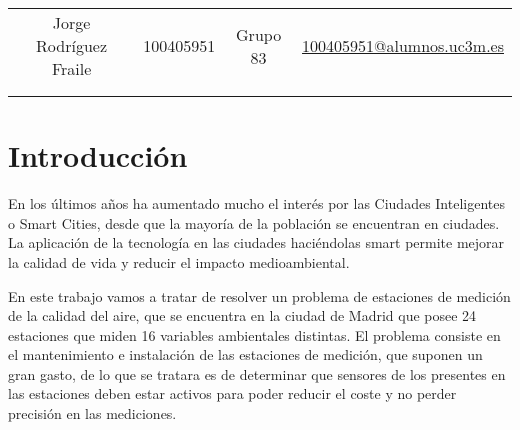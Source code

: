 \documentclass[12pt, spanish, pdftex]{UC3M_document}
\author{Jorge Rodríguez Fraile}
\begin{document}
\begin{titlepage}

  \begin{table}[b]
    \centering
    \begin{tabular}{ cccc }
      \large Jorge Rodríguez Fraile & \large 100405951 & \large Grupo 83 & \href{mailto:100405951@alumnos.uc3m.es}{\large 100405951@alumnos.uc3m.es} \\
                                    &                  &                 &                                                                           \\
                                    &                  &                 &                                                                           \\
    \end{tabular}
  \end{table}

\end{titlepage}

\newpage

\begin{spacing}{0.5}
  \hypersetup{linkcolor=black}    %
  \tableofcontents\newpage        %
  \listoffigures\newpage          %
  \listoftables\newpage           %
\end{spacing}


\section{Introducción}
En los últimos años ha aumentado mucho el interés por las Ciudades Inteligentes o Smart Cities, desde que la mayoría de la población se encuentran en ciudades. La aplicación de la tecnología en las ciudades haciéndolas smart permite mejorar la calidad de vida y reducir el impacto medioambiental.

En este trabajo vamos a tratar de resolver un problema de estaciones de medición de la calidad del aire, que se encuentra en la ciudad de Madrid que posee 24 estaciones que miden 16 variables ambientales distintas. El problema consiste en el mantenimiento e instalación de las estaciones de medición, que suponen un gran gasto, de lo que se tratara es de determinar que sensores de los presentes en las estaciones deben estar activos para poder reducir el coste y no perder precisión en las mediciones.
\end{document}
